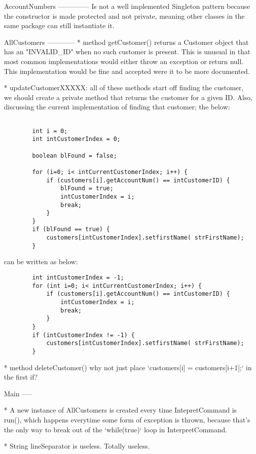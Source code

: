 AccountNumbers
--------------
Is not a well implemented Singleton pattern because the constructor is made protected and not private, meaning other classes in the same package can still instantiate it.


AllCustomers
------------
* method getCustomer() returns a Customer object that has an "INVALID\_ID" when no such customer is present. This is unusual in that most common implementations would either throw an exception or return null. This implementation would be fine and accepted were it to be more documented. 


* updateCustomerXXXXX: all of these methods start off finding the customer, we should create a private method that returns the customer for a given ID. Also, discussing the current implementation of finding that customer; the below: 

\begin{lstlisting}
	
		int i = 0;
		int intCustomerIndex = 0;
		
		boolean blFound = false;

		for (i=0; i< intCurrentCustomerIndex; i++) {
			if (customers[i].getAccountNum() == intCustomerID) {
				blFound = true;
				intCustomerIndex = i;
				break;
			}
		}
		if (blFound == true) {
			customers[intCustomerIndex].setfirstName( strFirstName);
		}
\end{lstlisting}
can be written as below: 
\begin{lstlisting}
		int intCustomerIndex = -1;
		for (int i=0; i< intCurrentCustomerIndex; i++) {
			if (customers[i].getAccountNum() == intCustomerID) {
				intCustomerIndex = i;
				break;
			}
		}
		if (intCustomerIndex != -1) {
			customers[intCustomerIndex].setfirstName( strFirstName);
		}
\end{lstlisting}

* method deleteCustomer() 
why not just place `customers[i] = customers[i+1];` in the first if? 

Main
-----

* A new instance of AllCustomers is created every time IntepretCommand is run(), which happens everytime some form of exception is thrown, because that's the only way to break out of the `while(true)` loop in InterpretCommand. 

* String lineSeparator is useless. Totally useless.
